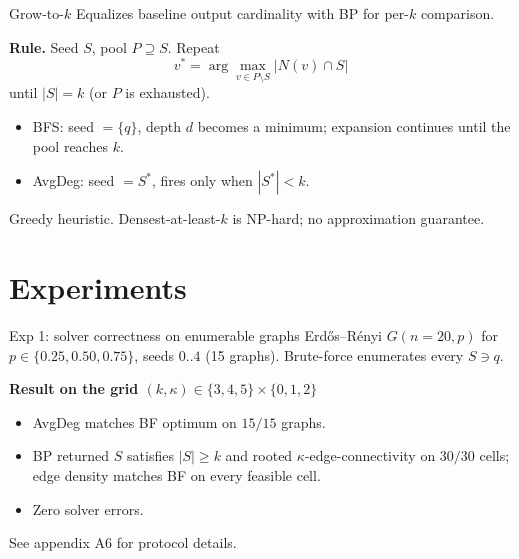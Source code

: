 \documentclass{beamer}
\begin{document}
\begin{frame}{Grow-to-$k$}
  Equalizes baseline output cardinality with BP for per-$k$ comparison.

  \vfill

  \textbf{Rule.} Seed $S$, pool $P \supseteq S$. Repeat
  \[
    v^* = \arg\max_{v \in P \setminus S} \bigl|N(v) \cap S\bigr|
  \]
  until $|S| = k$ (or $P$ is exhausted).

  \vfill

  \begin{itemize}
    \item BFS: seed $= \{q\}$, depth $d$ becomes a minimum; expansion continues until the pool reaches $k$.
    \item AvgDeg: seed $= S^*$, fires only when $|S^*| < k$.
  \end{itemize}

  \vfill

  \footnotesize Greedy heuristic. Densest-at-least-$k$ is NP-hard; no approximation guarantee.
\end{frame}

\section{Experiments}

\begin{frame}{Exp 1: solver correctness on enumerable graphs}
  Erd\H{o}s--R\'enyi $G(n=20, p)$ for $p \in \{0.25, 0.50, 0.75\}$, seeds $0..4$ (15 graphs). Brute-force enumerates every $S \ni q$.

  \vfill

  \textbf{Result on the grid $(k, \kappa) \in \{3,4,5\} \times \{0,1,2\}$}
  \begin{itemize}
    \item AvgDeg matches BF optimum on $15/15$ graphs.
    \item BP returned $S$ satisfies $|S| \ge k$ and rooted $\kappa$-edge-connectivity on $30/30$ cells; edge density matches BF on every feasible cell.
    \item Zero solver errors.
  \end{itemize}

  \vfill

  \footnotesize See appendix A6 for protocol details.
\end{frame}
\end{document}
